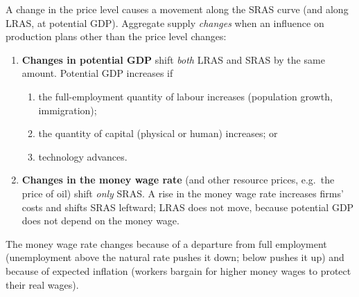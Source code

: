 A change in the price level causes a movement along the SRAS curve (and along LRAS, at
potential GDP). Aggregate supply \emph{changes} when an influence on production plans
other than the price level changes:
\begin{enumerate}
  \item \textbf{Changes in potential GDP} shift \emph{both} LRAS and SRAS by the same
        amount. Potential GDP increases if
        \begin{enumerate}
          \item the full-employment quantity of labour increases (population growth,
                immigration);
          \item the quantity of capital (physical or human) increases; or
          \item technology advances.
        \end{enumerate}
  \item \textbf{Changes in the money wage rate} (and other resource prices, e.g.\ the
        price of oil) shift \emph{only} SRAS. A rise in the money wage rate increases
        firms' costs and shifts SRAS leftward; LRAS does not move, because potential GDP
        does not depend on the money wage.
\end{enumerate}
The money wage rate changes because of a departure from full employment (unemployment
above the natural rate pushes it down; below pushes it up) and because of expected
inflation (workers bargain for higher money wages to protect their real wages).

\begin{center}
\end{center}

